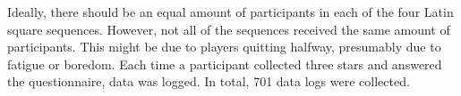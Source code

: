 
Ideally, there should be an equal amount of participants in each of the four Latin square sequences. However, not all of the sequences received the same amount of participants. This might be due to players quitting halfway, presumably due to fatigue or boredom. Each time a participant collected three stars and answered the questionnaire, data was logged. In total, 701 data logs were collected.

